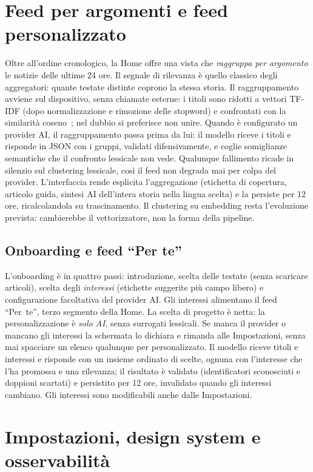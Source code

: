 \section{Feed per argomenti e feed personalizzato}
\label{sec:topic-feed}
Oltre all'ordine cronologico, la Home offre una vista che
\emph{raggruppa per argomento} le notizie delle ultime 24 ore. Il
segnale di rilevanza è quello classico degli aggregatori: quante testate
distinte coprono la stessa storia. Il raggruppamento avviene sul
dispositivo, senza chiamate esterne: i titoli sono ridotti a vettori
TF-IDF (dopo normalizzazione e rimozione delle stopword) e confrontati
con la similarità coseno~\cite{manning2008ir}; nel dubbio si
preferisce non unire. Quando è configurato un provider AI, il
raggruppamento passa prima da lui: il modello riceve i titoli e risponde
in JSON con i gruppi, validati difensivamente, e coglie somiglianze
semantiche che il confronto lessicale non vede. Qualunque fallimento
ricade in silenzio sul clustering lessicale, così il feed non degrada
mai per colpa del provider. L'interfaccia rende esplicita l'aggregazione
(etichetta di copertura, articolo guida, sintesi AI dell'intera storia
nella lingua scelta) e la persiste per 12 ore, ricalcolandola su
trascinamento. Il clustering su embedding resta l'evoluzione prevista:
cambierebbe il vettorizzatore, non la forma della pipeline.

\subsection{Onboarding e feed ``Per te''}
\label{sec:personalization}
L'onboarding è in quattro passi: introduzione, scelta delle testate
(senza scaricare articoli), scelta degli \emph{interessi} (etichette
suggerite più campo libero) e configurazione facoltativa del provider
AI. Gli interessi alimentano il feed ``Per~te'', terzo segmento della
Home. La scelta di progetto è netta: la personalizzazione è \emph{solo
AI}, senza surrogati lessicali. Se manca il provider o mancano gli
interessi la schermata lo dichiara e rimanda alle Impostazioni, senza
mai spacciare un elenco qualunque per personalizzato. Il modello riceve
titoli e interessi e risponde con un insieme ordinato di scelte, ognuna
con l'interesse che l'ha promossa e una rilevanza; il risultato è
validato (identificatori sconosciuti e doppioni scartati) e persistito
per 12 ore, invalidato quando gli interessi cambiano. Gli interessi sono
modificabili anche dalle Impostazioni.

\section{Impostazioni, design system e osservabilità}
